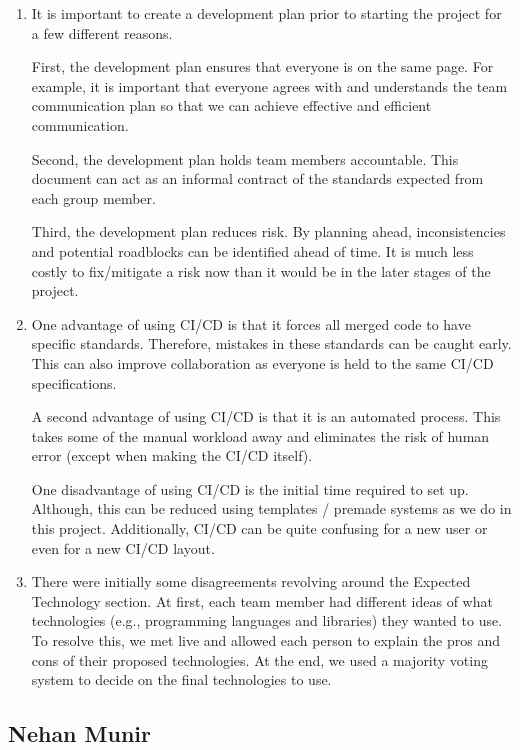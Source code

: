 \documentclass{article}
\begin{document}
\begin{enumerate}
    \item It is important to create a development plan prior to starting the project for a few different reasons.

    First, the development plan ensures that everyone is on the same page. For example, it is important that everyone agrees with and understands the team communication plan so that we can achieve effective and efficient communication.

    Second, the development plan holds team members accountable. This document can act as an informal contract of the standards expected from each group member.

    Third, the development plan reduces risk. By planning ahead, inconsistencies and potential roadblocks can be identified ahead of time. It is much less costly to fix/mitigate a risk now than it would be in the later stages of the project.

    \item One advantage of using CI/CD is that it forces all merged code to have specific standards. Therefore, mistakes in these standards can be caught early. This can also improve collaboration as everyone is held to the same CI/CD specifications.
    
    A second advantage of using CI/CD is that it is an automated process. This takes some of the manual workload away and eliminates the risk of human error (except when making the CI/CD itself).

    One disadvantage of using CI/CD is the initial time required to set up. Although, this can be reduced using templates / premade systems as we do in this project. Additionally, CI/CD can be quite confusing for a new user or even for a new CI/CD layout.

    \item There were initially some disagreements revolving around the Expected Technology section. At first, each team member had different ideas of what technologies (e.g., programming languages and libraries) they wanted to use. To resolve this, we met live and allowed each person to explain the pros and cons of their proposed technologies. At the end, we used a majority voting system to decide on the final technologies to use.
\end{enumerate}

\subsection*{Nehan Munir}
\end{document}

